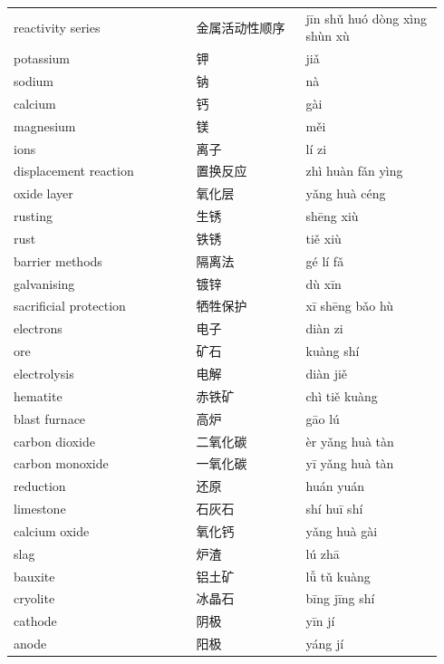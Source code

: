 \documentclass[11pt]{article}
\begin{document}
\begin{longtable}{@{}p{0.40\linewidth}p{0.24\linewidth}p{0.30\linewidth}@{}}
reactivity series & 金属活动性顺序 & jīn shǔ huó dòng xìng shùn xù \\
potassium & 钾 & jiǎ \\
sodium & 钠 & nà \\
calcium & 钙 & gài \\
magnesium & 镁 & měi \\
ions & 离子 & lí zi \\
displacement reaction & 置换反应 & zhì huàn fǎn yìng \\
oxide layer & 氧化层 & yǎng huà céng \\
rusting & 生锈 & shēng xiù \\
rust & 铁锈 & tiě xiù \\
barrier methods & 隔离法 & gé lí fǎ \\
galvanising & 镀锌 & dù xīn \\
sacrificial protection & 牺牲保护 & xī shēng bǎo hù \\
electrons & 电子 & diàn zi \\
ore & 矿石 & kuàng shí \\
electrolysis & 电解 & diàn jiě \\
hematite & 赤铁矿 & chì tiě kuàng \\
blast furnace & 高炉 & gāo lú \\
carbon dioxide & 二氧化碳 & èr yǎng huà tàn \\
carbon monoxide & 一氧化碳 & yī yǎng huà tàn \\
reduction & 还原 & huán yuán \\
limestone & 石灰石 & shí huī shí \\
calcium oxide & 氧化钙 & yǎng huà gài \\
slag & 炉渣 & lú zhā \\
bauxite & 铝土矿 & lǚ tǔ kuàng \\
cryolite & 冰晶石 & bīng jīng shí \\
cathode & 阴极 & yīn jí \\
anode & 阳极 & yáng jí \\
\end{longtable}
\end{document}
